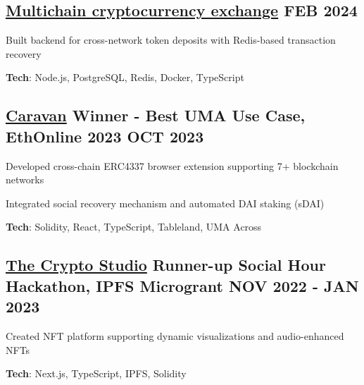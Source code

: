 \documentclass[letter,10pt]{article}
\begin{document}
\subsection{{ \href{https://github.com/Suhel-Kap/crypto-exchanger}{Multichain cryptocurrency exchange} \hfill FEB 2024}}
\begin{zitemize}
  \item Built backend for cross-network token deposits with Redis-based transaction recovery
  \item \textbf{Tech}: Node.js, PostgreSQL, Redis, Docker, TypeScript
\end{zitemize}

\subsection{{ \href{https://github.com/0xabh/caravan}{Caravan} Winner - Best UMA Use Case, EthOnline 2023 \hfill OCT 2023}}
\begin{zitemize}
  \item Developed cross-chain ERC4337 browser extension supporting 7+ blockchain networks
  \item Integrated social recovery mechanism and automated DAI staking (sDAI)
  \item \textbf{Tech}: Solidity, React, TypeScript, Tableland, UMA Across
\end{zitemize}


\subsection{{ \href{https://github.com/Suhel-Kap/the-crypto-studio}{The Crypto Studio} Runner-up Social Hour Hackathon, IPFS Microgrant \hfill NOV 2022 - JAN 2023}}
\begin{zitemize}
  \item Created NFT platform supporting dynamic visualizations and audio-enhanced NFTs
  \item \textbf{Tech}: Next.js, TypeScript, IPFS, Solidity
\end{zitemize}
\end{document}
